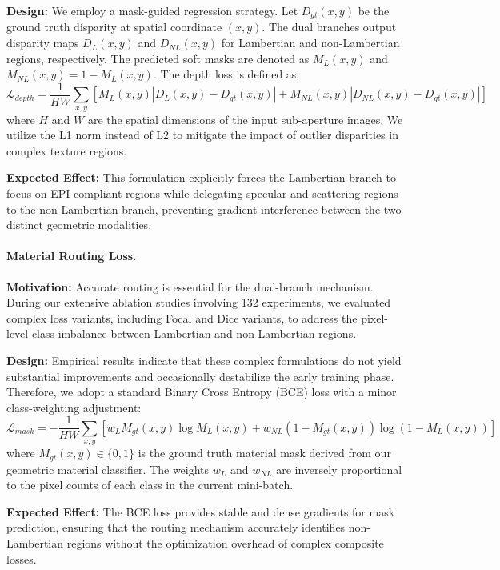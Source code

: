 \documentclass[lettersize,journal]{IEEEtran}
\begin{document}
\textbf{Design:} We employ a mask-guided regression strategy. Let $D_{gt}(x,y)$ be the ground truth disparity at spatial coordinate $(x,y)$. The dual branches output disparity maps $D_{L}(x,y)$ and $D_{NL}(x,y)$ for Lambertian and non-Lambertian regions, respectively. The predicted soft masks are denoted as $M_{L}(x,y)$ and $M_{NL}(x,y) = 1 - M_{L}(x,y)$. The depth loss is defined as:
\begin{equation}
\label{eq:eq24}
\mathcal{L}_{depth} = \frac{1}{HW} \sum_{x,y} \left[ M_{L}(x,y) \left| D_{L}(x,y) - D_{gt}(x,y) \right| + M_{NL}(x,y) \left| D_{NL}(x,y) - D_{gt}(x,y) \right| \right]
\end{equation}
where $H$ and $W$ are the spatial dimensions of the input sub-aperture images. We utilize the L1 norm instead of L2 to mitigate the impact of outlier disparities in complex texture regions.

\textbf{Expected Effect:} This formulation explicitly forces the Lambertian branch to focus on EPI-compliant regions while delegating specular and scattering regions to the non-Lambertian branch, preventing gradient interference between the two distinct geometric modalities.

\paragraph{Material Routing Loss.}
\textbf{Motivation:} Accurate routing is essential for the dual-branch mechanism. During our extensive ablation studies involving 132 experiments, we evaluated complex loss variants, including Focal and Dice variants, to address the pixel-level class imbalance between Lambertian and non-Lambertian regions.

\textbf{Design:} Empirical results indicate that these complex formulations do not yield substantial improvements and occasionally destabilize the early training phase. Therefore, we adopt a standard Binary Cross Entropy (BCE) loss with a minor class-weighting adjustment:
\begin{equation}
\label{eq:eq25}
\mathcal{L}_{mask} = -\frac{1}{HW} \sum_{x,y} \left[ w_{L} M_{gt}(x,y) \log M_{L}(x,y) + w_{NL} (1 - M_{gt}(x,y)) \log (1 - M_{L}(x,y)) \right]
\end{equation}
where $M_{gt}(x,y) \in \{0, 1\}$ is the ground truth material mask derived from our geometric material classifier. The weights $w_{L}$ and $w_{NL}$ are inversely proportional to the pixel counts of each class in the current mini-batch.

\textbf{Expected Effect:} The BCE loss provides stable and dense gradients for mask prediction, ensuring that the routing mechanism accurately identifies non-Lambertian regions without the optimization overhead of complex composite losses.
\end{document}
